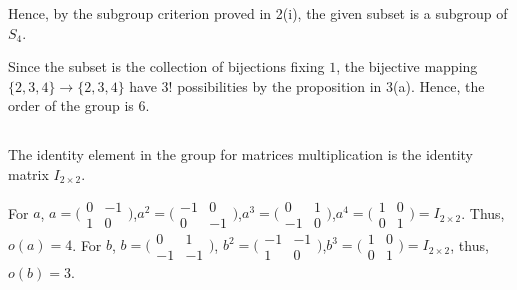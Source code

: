 \documentclass[12pt]{article}
\begin{document}
Hence, by the subgroup criterion proved in 2(i), the given subset is a subgroup of $S_4$.

Since the subset is the collection of bijections fixing $1$, the bijective mapping $\{2,3,4\}\rightarrow\{{2,3,4}\}$ have $3!$ possibilities by the proposition in 3(a). Hence, the order of the group is $6$.
\subsection{} %
The identity element in the group for matrices multiplication is the identity matrix $I_{2\times2}$.

For $a$, $a=\big(\begin{smallmatrix}0 & -1\\1 & 0\end{smallmatrix}\big)$,$a^2=\big(\begin{smallmatrix}-1 & 0\\0 & -1\end{smallmatrix}\big)$,$a^3=\big(\begin{smallmatrix}0 & 1\\-1 & 0\end{smallmatrix}\big)$,$a^4=\big(\begin{smallmatrix}1 & 0\\0 & 1\end{smallmatrix}\big)=I_{2\times2}$. Thus, $o(a)=4$. For $b$, $b=\big(\begin{smallmatrix}0 & 1\\-1 & -1\end{smallmatrix}\big)$, $b^2=\big(\begin{smallmatrix}-1 & -1\\1 & 0\end{smallmatrix}\big)$,$b^3=\big(\begin{smallmatrix}1 & 0\\0 & 1\end{smallmatrix}\big)=I_{2\times2}$, thus, $o(b)=3$.










\newpage
\section{} %
\end{document}
